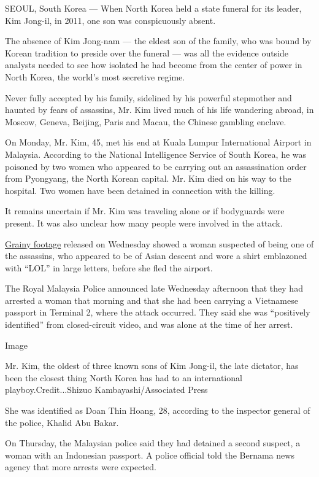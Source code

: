 SEOUL, South Korea --- When North Korea held a state funeral for its
leader, Kim Jong-il, in 2011, one son was conspicuously absent.

The absence of Kim Jong-nam --- the eldest son of the family, who was
bound by Korean tradition to preside over the funeral --- was all the
evidence outside analysts needed to see how isolated he had become from
the center of power in North Korea, the world's most secretive regime.

Never fully accepted by his family, sidelined by his powerful stepmother
and haunted by fears of assassins, Mr. Kim lived much of his life
wandering abroad, in Moscow, Geneva, Beijing, Paris and Macau, the
Chinese gambling enclave.

On Monday, Mr. Kim, 45, met his end at Kuala Lumpur International
Airport in Malaysia. According to the National Intelligence Service of
South Korea, he was poisoned by two women who appeared to be carrying
out an assassination order from Pyongyang, the North Korean capital. Mr.
Kim died on his way to the hospital. Two women have been detained in
connection with the killing.

It remains uncertain if Mr. Kim was traveling alone or if bodyguards
were present. It was also unclear how many people were involved in the
attack.

\href{http://www.thestar.com.my/news/nation/2017/02/15/clearer-image-of-killer-caught-on-cctv/}{Grainy
footage} released on Wednesday showed a woman suspected of being one of
the assassins, who appeared to be of Asian descent and wore a shirt
emblazoned with ``LOL'' in large letters, before she fled the airport.

The Royal Malaysia Police announced late Wednesday afternoon that they
had arrested a woman that morning and that she had been carrying a
Vietnamese passport in Terminal 2, where the attack occurred. They said
she was ``positively identified'' from closed-circuit video, and was
alone at the time of her arrest.

Image

Mr. Kim, the oldest of three known sons of Kim Jong-il, the late
dictator, has been the closest thing North Korea has had to an
international playboy.Credit...Shizuo Kambayashi/Associated Press

She was identified as Doan Thin Hoang, 28, according to the inspector
general of the police, Khalid Abu Bakar.

On Thursday, the Malaysian police said they had detained a second
suspect, a woman with an Indonesian passport. A police official told the
Bernama news agency that more arrests were expected.


